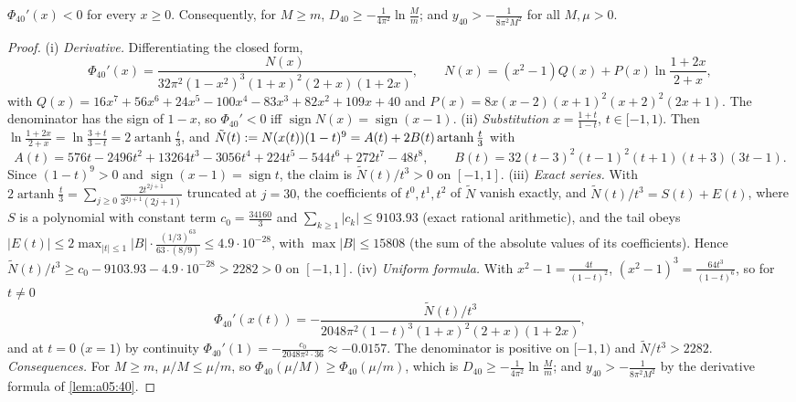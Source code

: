 \begin{lemma}\label{lem:a05:S}
$\Phi_{40}'(x)<0$ for every $x\ge0$. Consequently, for $M\ge m$, $D_{40}\ge-\frac1{4\pi^2}\ln\frac Mm$; and $y_{40}>-\frac1{8\pi^2M^2}$ for all $M,\mu>0$.
\end{lemma}
\begin{proof}
(i) \emph{Derivative.} Differentiating the closed form,
\[
\Phi_{40}'(x)=\frac{N(x)}{32\pi^2(1-x^2)^3(1+x)^2(2+x)(1+2x)},\qquad N(x)=(x^2-1)Q(x)+P(x)\ln\frac{1+2x}{2+x},
\]
with $Q(x)=16x^7+56x^6+24x^5-100x^4-83x^3+82x^2+109x+40$ and $P(x)=8x(x-2)(x+1)^2(x+2)^2(2x+1)$. The denominator has the sign of $1-x$, so $\Phi_{40}'<0$ iff $\operatorname{sign}N(x)=\operatorname{sign}(x-1)$.
(ii) \emph{Substitution} $x=\frac{1+t}{1-t}$, $t\in[-1,1)$. Then $\ln\frac{1+2x}{2+x}=\ln\frac{3+t}{3-t}=2\operatorname{artanh}\frac t3$, and $\tilde N(t):= N(x(t))(1-t)^9=A(t)+2B(t)\operatorname{artanh}\frac t3$ with
\[
A(t)=576t-2496t^2+13264t^3-3056t^4+224t^5-544t^6+272t^7-48t^8,\qquad B(t)=32(t-3)^2(t-1)^2(t+1)(t+3)(3t-1).
\]
Since $(1-t)^9>0$ and $\operatorname{sign}(x-1)=\operatorname{sign}t$, the claim is $\tilde N(t)/t^3>0$ on $[-1,1]$.
(iii) \emph{Exact series.} With $2\operatorname{artanh}\frac t3=\sum_{j\ge0}\frac{2t^{2j+1}}{3^{2j+1}(2j+1)}$ truncated at $j=30$, the coefficients of $t^0,t^1,t^2$ of $\tilde N$ vanish exactly, and $\tilde N(t)/t^3=S(t)+E(t)$, where $S$ is a polynomial with constant term $c_0=\frac{34160}3$ and $\sum_{k\ge1}|c_k|\le9103.93$ (exact rational arithmetic), and the tail obeys $|E(t)|\le2\max_{|t|\le1}|B|\cdot\frac{(1/3)^{63}}{63\cdot(8/9)}\le4.9\cdot10^{-28}$, with $\max|B|\le15808$ (the sum of the absolute values of its coefficients). Hence $\tilde N(t)/t^3\ge c_0-9103.93-4.9\cdot10^{-28}>2282>0$ on $[-1,1]$.
(iv) \emph{Uniform formula.} With $x^2-1=\frac{4t}{(1-t)^2}$, $(x^2-1)^3=\frac{64t^3}{(1-t)^6}$, so for $t\ne0$
\[
\Phi_{40}'(x(t))=-\frac{\tilde N(t)/t^3}{2048\pi^2(1-t)^3(1+x)^2(2+x)(1+2x)},
\]
and at $t=0$ ($x=1$) by continuity $\Phi_{40}'(1)=-\frac{c_0}{2048\pi^2\cdot36}\approx-0.0157$. The denominator is positive on $[-1,1)$ and $\tilde N/t^3>2282$.
\emph{Consequences.} For $M\ge m$, $\mu/M\le\mu/m$, so $\Phi_{40}(\mu/M)\ge\Phi_{40}(\mu/m)$, which is $D_{40}\ge-\frac1{4\pi^2}\ln\frac Mm$; and $y_{40}>-\frac1{8\pi^2M^2}$ by the derivative formula of \cref{lem:a05:40}.
\end{proof}

